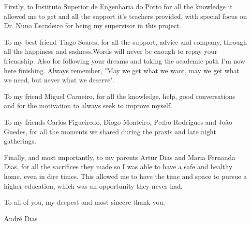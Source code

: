 \begin{acknowledgements}
    Firstly, to Instituto Superior de Engenharia do Porto for all the knowledge it allowed me to get and all the support it's teachers provided, with special focus on Dr. Nuno Escudeiro for being my supervisor in this project.

    To my best friend Tiago Soares, for all the support, advice and company, through all the happiness and sadness.Words will never be enough to repay your friendship.
    Also for following your dreams and taking the academic path I'm now here finishing. Always remember, "May we get what we want, may we get what we need, but never what we deserve".

    To my friend Miguel Carneiro, for all the knowledge, help, good conversations and for the motivation to always seek to improve myself.

    To my friends Carlos Figueiredo, Diogo Monteiro, Pedro Rodrigues and João Guedes, for all the moments we shared during the praxis and late night gatherings.

    Finally, and most importantly, to my parents Artur Dias and Maria Fernanda Dias, for all the sacrifices they made so I was able to have a safe and healthy home, even in dire times.
    This allowed me to have the time and space to pursue a higher education, which was an opportunity they never had.

    To all of you, my deepest and most sincere thank you,

    André Dias

\end{acknowledgements}


\tableofcontents %

\listoffigures %

\listoftables %



\renewcommand{\lstlistlistingname}{List of Source Code}
\iflanguage{portuguese}{
\renewcommand{\lstlistlistingname}{Lista de C\'odigo}
}
\lstlistoflistings %
\addchaptertocentry{\lstlistlistingname}


